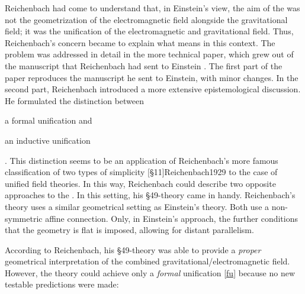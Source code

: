 \documentclass[draft]{article}
\begin{document}
Reichenbach had come to understand that, in Einstein's view, the aim of the \uftp was not the geometrization of the electromagnetic field alongside the gravitational field; it was the unification of the electromagnetic and gravitational field. Thus, Reichenbach's concern became to explain what  means in this context. The problem was addressed in detail in the more technical paper, which grew out of the manuscript that Reichenbach had sent to Einstein \citep{Reichenbach1929a}. The first part of the paper reproduces the manuscript he sent to Einstein, with minor changes. In the second part, Reichenbach introduced a more extensive epistemological discussion. He formulated the distinction between  \begin{inparaenum}[(a)]
\item \label{fu} a formal unification and \item \label{iu} an inductive unification
\end{inparaenum}. This distinction seems to be an application of  Reichenbach's more famous classification of two types of simplicity [\S11]{Reichenbach1929} to the case of unified field theories. In this way, Reichenbach could describe two opposite approaches to the \uftp. In this setting, his \S49-theory came in handy. Reichenbach's theory uses a similar geometrical setting as Einstein's theory. Both use a non-symmetric affine connection. Only, in Einstein's approach, the further conditions that the geometry is flat is imposed, allowing for distant parallelism.

According to Reichenbach, his \S49-theory was able to provide a \emph{proper} geometrical interpretation of the combined gravitational/electromagnetic field. However, the theory could achieve only a \emph{formal} unification \cref{fu} because no new testable predictions were made:
\end{document}
